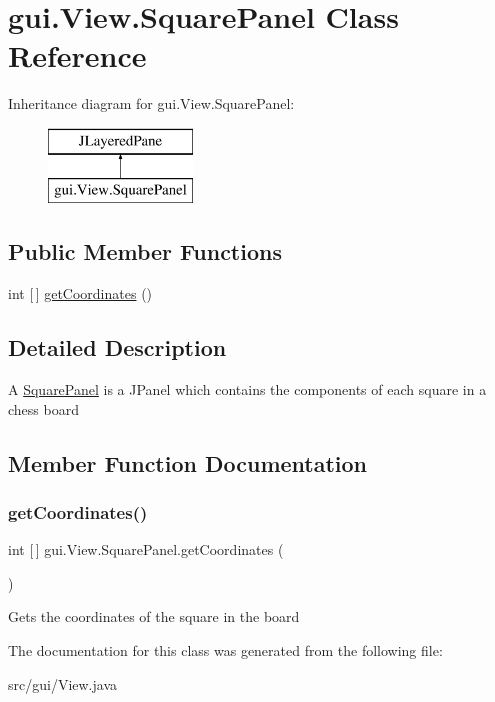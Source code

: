 \hypertarget{classgui_1_1_view_1_1_square_panel}{}\section{gui.\+View.\+Square\+Panel Class Reference}
\label{classgui_1_1_view_1_1_square_panel}
Inheritance diagram for gui.\+View.\+Square\+Panel\+:\begin{figure}[H]
\begin{center}
\leavevmode
\includegraphics[height=2.000000cm]{classgui_1_1_view_1_1_square_panel}
\end{center}
\end{figure}
\subsection*{Public Member Functions}
\begin{DoxyCompactItemize}
\item 
int \mbox{[}$\,$\mbox{]} \mbox{\hyperlink{classgui_1_1_view_1_1_square_panel_a97328a4344b3c3e02319419dcdb3e7c5}{get\+Coordinates}} ()
\end{DoxyCompactItemize}


\subsection{Detailed Description}
A \mbox{\hyperlink{classgui_1_1_view_1_1_square_panel}{Square\+Panel}} is a J\+Panel which contains the components of each square in a chess board 

\subsection{Member Function Documentation}
\mbox{\label{classgui_1_1_view_1_1_square_panel_a97328a4344b3c3e02319419dcdb3e7c5}} 
\subsubsection{\texorpdfstring{get\+Coordinates()}{getCoordinates()}}
{\footnotesize\ttfamily int \mbox{[}$\,$\mbox{]} gui.\+View.\+Square\+Panel.\+get\+Coordinates (\begin{DoxyParamCaption}{ }\end{DoxyParamCaption})}

Gets the coordinates of the square in the board 

The documentation for this class was generated from the following file\+:\begin{DoxyCompactItemize}
\item 
src/gui/View.\+java\end{DoxyCompactItemize}
